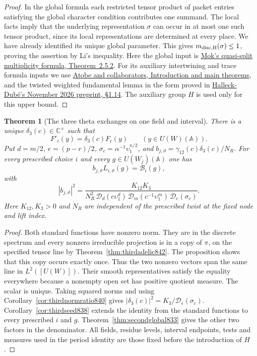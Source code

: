 \documentclass[a4paper,11pt]{article}
\newtheorem{theorem}[proposition]{Theorem}
\theoremstyle{definition}
\theoremstyle{remark}
\numberwithin{equation}{section}
\begin{document}
\begin{proof}
In the global formula each restricted tensor product of packet
entries satisfying the global character condition contributes one
summand. The local facts imply that the underlying representation
\(\sigma\) can occur in at most one such tensor product, since its
local representations are determined at every place. We have
already identified its unique global parameter. This gives
\(m_{\rm disc,H}(\sigma)\le1\), proving the assertion by Li's
inequality. Here the global input is
\href{https://arxiv.org/pdf/1206.0882}
{Mok's quasi-split multiplicity formula, Theorem~2.5.2}.
For its auxiliary intertwining and trace formula inputs we use
\href{https://arxiv.org/pdf/2410.13504}
{Atobe and collaborators, Introduction and main theorems}, and
the twisted weighted fundamental lemma in the form proved in
\href{https://arxiv.org/abs/2611.26750}
{Halleck-Dub\'e's November 2026 preprint, \S1.14}.
The auxiliary group \(H\) is used only for this upper bound.
\end{proof}

\begin{theorem}[The three theta exchanges on one field and interval]
\leavevmode\label{thm:thirdglobal843}
There is a unique \(\delta_3(c)\in\mathbb C^\times\) such that
\[
                F'_c(y)=\delta_3(c)F_c(y)
                    \qquad(y\in U(W)(\mathbb A)).
\]
Put \(d=m/2\), \(e=(p-r)/2\),
\(\sigma_c=\alpha^{-1}\upsilon_1^{n/2}\), and
\(b_{j,\vartheta}=\gamma_{12}(c)\delta_3(c)/N_R\).
For every prescribed choice \(i\) and every
\(g\in U(W_j)(\mathbb A)\) one has
\[
             b_{j,\vartheta} L_{i,\vartheta}(g)=\mathcal B_i(g),
\]
with
\[
 |b_{j,\vartheta}|^2=
 \frac{K_{12}K_3}
 {N_R^2\,\mathcal D_d(c\upsilon_1^d)\,
          \mathcal D_m(c^{-1}\upsilon_1^m)\,
          \mathcal D_e(\sigma_c)} .
\]
Here \(K_{12},K_3>0\) and \(N_R\) are independent of the prescribed
twist at the fixed node and lift index.
\end{theorem}
\begin{proof}
Both standard functions have nonzero norm. They are in the discrete
spectrum and every nonzero irreducible projection is in a copy of
\(\pi\), on the specified tensor line by
Theorem~\ref{thm:thirdadelic842}. The proposition shows that this
copy occurs exactly once. Thus the two nonzero vectors span the
same line in \(L^2([U(W)])\). Their smooth representatives satisfy
the equality everywhere because a nonempty open set has positive
quotient measure. The scalar is unique. Taking squared norms and
using Corollary~\ref{cor:thirdnormratio840} gives
\(\lvert\delta_3(c)\rvert^2=K_3/\mathcal D_e(\sigma_c)\).
Corollary~\ref{cor:thirdseed838} extends the identity from the
standard functions to every prescribed \(i\) and \(g\).
Theorem~\ref{thm:secondglobal833} gives the other two factors in the
denominator. All fields, residue levels, interval endpoints, tests
and measures used in the period identity are those fixed before
the introduction of \(H\).
\end{proof}
\clearpage
\end{document}
